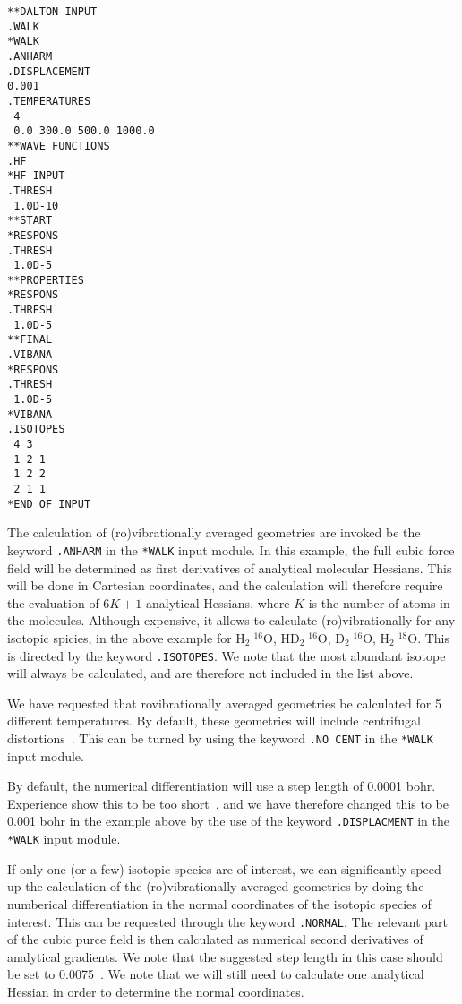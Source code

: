 \begin{verbatim}
**DALTON INPUT
.WALK
*WALK
.ANHARM
.DISPLACEMENT
0.001
.TEMPERATURES
 4
 0.0 300.0 500.0 1000.0
**WAVE FUNCTIONS
.HF
*HF INPUT
.THRESH
 1.0D-10
**START
*RESPONS
.THRESH
 1.0D-5
**PROPERTIES
*RESPONS
.THRESH
 1.0D-5
**FINAL
.VIBANA
*RESPONS
.THRESH
 1.0D-5
*VIBANA
.ISOTOPES
 4 3
 1 2 1
 1 2 2
 2 1 1
*END OF INPUT
\end{verbatim}

The calculation of (ro)vibrationally averaged geometries are invoked
be the keyword \verb|.ANHARM| in the \verb|*WALK| input module. In
this example, the full cubic force field will be determined as 
first derivatives of analytical molecular Hessians. This will be done
in Cartesian coordinates, and the calculation will therefore require
the evaluation of $6K + 1$ analytical Hessians, where $K$ is the
number of atoms in the molecules. Although expensive, it allows to
calculate (ro)vibrationally for any isotopic spicies, in the above
example for H$_2\;^{16}$O, HD$_2\;^{16}$O, D$_2\;^{16}$O,
H$_2\;^{18}$O. This is directed by the keyword \verb|.ISOTOPES|. We
note that the most abundant isotope will always be calculated, and are
therefore not included in the list above.

We have requested that rovibrationally averaged geometries be
calculated for 5 different temperatures. By default, these geometries
will include centrifugal distortions~\cite{krjljv}. This can be
turned by using the keyword \verb|.NO CENT| in the \verb|*WALK| input
module.

By default, the numerical differentiation will use a step length of
0.0001 bohr. Experience show this to be too short~\cite{poakrprtjcp112}, and we have
therefore changed this to be 0.001 bohr in the example above by the
use of the keyword \verb|.DISPLACMENT| in the \verb|*WALK| input
module.

If only one (or a few) isotopic species are of interest, we can significantly
speed up the calculation of the (ro)vibrationally averaged geometries
by doing the numberical differentiation in the normal coordinates of
the isotopic species of interest. This can be requested through the
keyword \verb|.NORMAL|. The relevant part of the cubic purce field is
then calculated as numerical second derivatives of analytical
gradients. We note that the suggested step length in this case should
be set to 0.0075~\cite{poakrprtjcp112}. We note that we will still need to calculate one
analytical Hessian in order to determine the normal coordinates.

